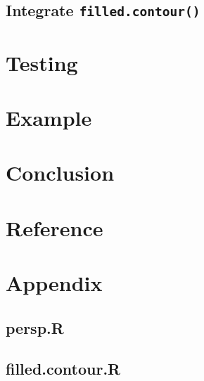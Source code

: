 \documentclass[paper=a4, fontsize=11pt]{report}
\begin{document}
\section{Integrate \texttt{filled.contour()}}

\chapter{Testing}
\chapter{Example}
\chapter{Conclusion}
\chapter{Reference}
\chapter{Appendix}
\section{persp.R}
\section{filled.contour.R}
\end{document}
